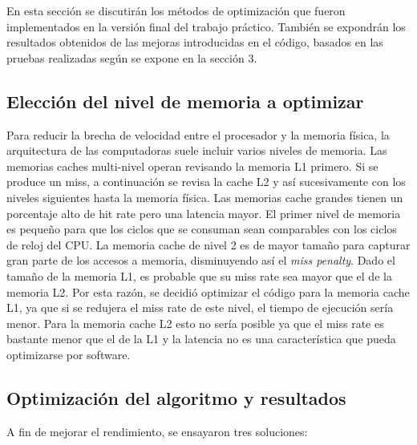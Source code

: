 \documentclass[a4paper,10pt]{article}
\begin{document}
En esta secci\'on se discutir\'an los m\'etodos de optimizaci\'on que fueron implementados en la versi\'on final del trabajo pr\'actico. Tambi\'en se expondr\'an los resultados obtenidos de las mejoras introducidas en el c\'odigo, basados en las pruebas realizadas seg\'un se expone en la secci\'on 3.

\subsection{Elecci\'on del nivel de memoria a optimizar}
Para reducir la brecha de velocidad entre el procesador y la memoria f\'isica,
la arquitectura de las computadoras suele incluir varios niveles de memoria. Las memorias caches multi-nivel operan 
revisando la memoria L1 primero. Si se produce un miss, a continuaci\'on se revisa la cache L2 y as\'i sucesivamente con los niveles siguientes 
hasta la memoria f\'isica. Las memorias cache grandes tienen un porcentaje alto de hit rate pero una latencia mayor. El primer nivel de memoria 
es peque\~no para que los ciclos que se consuman sean comparables con los ciclos de reloj del CPU. La memoria cache de nivel 2 es de mayor tama\~no para 
capturar gran parte de los accesos a memoria, disminuyendo as\'i el \textit{miss penalty}. Dado el tama\~no de la memoria L1, es probable que su miss rate sea mayor que 
el de la memoria L2.  Por esta raz\'on, se decidi\'o optimizar el c\'odigo para la memoria cache L1, ya que si se redujera el miss rate de este nivel, el tiempo de 
ejecuci\'on ser\'ia menor. Para la memoria cache L2 esto no ser\'ia posible ya que el miss rate es bastante menor que el de la L1 y la latencia no 
es una caracter\'istica que pueda optimizarse por software.

\subsection{Optimizaci\'on del algoritmo y resultados}

A fin de mejorar el rendimiento, se ensayaron tres soluciones:\\
\end{document}
